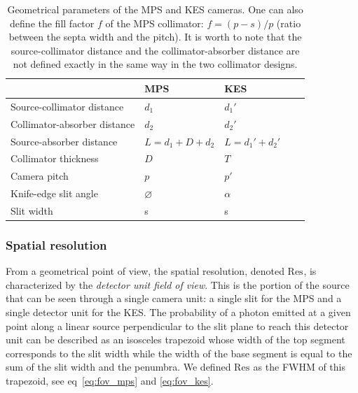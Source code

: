 \documentclass[a4paper,english,12pt]{article}
\begin{document}
\begin{table}[h]
\centering
\begin{tabular}{lllll}
	\midrule
																& MPS               & KES \\
	\midrule
	Source-collimator distance		& $d_1$             & $d_1'$ \\
 	Collimator-absorber distance	& $d_2$             & $d_2'$ \\
	Source-absorber distance			& $L=d_1+D+d_2$			& $L=d_1'+d_2'$\\
 	Collimator thickness 					& $D$               & $T$ \\
	Camera pitch									& $p$								& $p'$\\
	Knife-edge slit angle					& $\varnothing$			& $\alpha$\\	
	Slit width										& s & s \\ %
	\midrule
\end{tabular}
\caption{Geometrical parameters of the MPS and KES cameras. One can also define the fill factor $f$ of the MPS collimator: $f=(p-s)/p$ (ratio between the septa width and the pitch). It is worth to note that the source-collimator distance and the collimator-absorber distance are not defined exactly in the same way in the two collimator designs.}
\label{table:CamerasParameters}
\end{table}



\subsubsection{Spatial resolution}

\newcommand\FOV{\textrm{Res}}
\newcommand\MPS{\textrm{MPS}}
\newcommand\KES{\textrm{KES}}
\newcommand\du{}
\newcommand\DE{\textrm{Eff}}

From a geometrical point of view, the spatial resolution, denoted $\FOV_{\du}$, is characterized by the \textit{detector unit field of view}. This is the portion of
the source that can be seen through a single camera unit: a single slit for the MPS and a single detector unit for the KES. The probability of a photon emitted at a
given point along a linear source perpendicular to the slit plane to reach
this detector unit can be described as an isosceles trapezoid whose width of the top segment corresponds to the slit width while the width of the base segment is equal to the sum of the slit width and the penumbra. We defined $\FOV_{\du}$
as the FWHM of this trapezoid, see eq~\ref{eq:fov_mps} and \ref{eq:fov_kes}.
\end{document}
